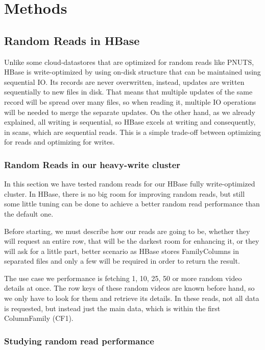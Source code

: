 \chapter{Methods}
\label{chapter:methods II}
 
\section{Random Reads in HBase}

Unlike some cloud-datastores that are optimized for random reads like PNUTS, HBase is write-optimized by using on-disk structure that can be maintained using sequential IO. Its records are never overwritten, instead, updates are written sequentially to new files in disk. That means that multiple updates of the same record will be spread over many files, so when reading it, multiple IO operations will be needed to merge the separate updates. On the other hand, as we already explained, all writing is sequential, so HBase excels at writing and consequently, in scans, which are sequential reads. This is a simple trade-off between optimizing for reads and optimizing for writes.

\subsection{Random Reads in our heavy-write cluster}

In this section we have tested random reads for our HBase fully write-optimized cluster. In HBase, there is no big room for improving random reads, but still some little tuning can be done to achieve a better random read performance than the default one.
\par
Before starting, we must describe how our reads are going to be, whether they will request an entire row, that will be the darkest room for enhancing it, or they will ask for a little part, better scenario as HBase stores FamilyColumns in separated files and only a few will be required in order to return the result. 
\par
The use case we performance is fetching 1, 10, 25, 50 or more random video details at once. The row keys of these random videos are known before hand, so we only have to look for them and retrieve its details. In these reads, not all data is requested, but instead just the main data, which is within the first ColumnFamily (CF1).                  

\subsection{Studying random read performance}

